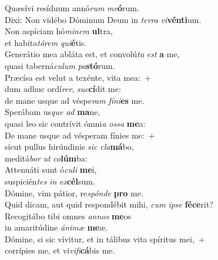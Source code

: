 \evenverse Quæsívi resíduum annó\textit{rum} \textit{me}\textbf{ó}rum.~\*\\
\evenverse Dixi: Non vidébo Dóminum Deum in \textit{ter}\textit{ra} \textit{vi}\textbf{vén}\textbf{ti}um.\\
\oddverse Non aspíciam hó\textit{mi}\textit{nem} \textbf{ul}tra,~\*\\
\oddverse et habita\textit{tó}\textit{rem} \textit{qui}\textbf{é}tis.\\
\evenverse Generátio mea abláta est, et convolú\textit{ta} \textit{est} \textbf{a} me,~\*\\
\evenverse quasi taberná\textit{cu}\textit{lum} \textit{pa}\textbf{stó}rum.\\
\oddverse Præcísa est velut a texénte, vita mea:~+\\
\oddverse  dum adhuc ordí\textit{rer}, \textit{suc}\textbf{cí}dit me:~\*\\
\oddverse de mane usque ad véspe\textit{ram} \textit{fí}\textit{ni}\textbf{es} me.\\
\evenverse Sperábam us\textit{que} \textit{ad} \textbf{ma}ne,~\*\\
\evenverse quasi leo sic contrívit ómni\textit{a} \textit{os}\textit{sa} \textbf{me}a:\\
\oddverse De mane usque ad vésperam fínies me:~+\\
\oddverse  sicut pullus hirúndinis \textit{sic} \textit{cla}\textbf{má}bo,~\*\\
\oddverse meditá\textit{bor} \textit{ut} \textit{co}\textbf{lúm}ba:\\
\evenverse Attenuáti sunt ó\textit{cu}\textit{li} \textbf{me}i,~\*\\
\evenverse suspicién\textit{tes} \textit{in} \textit{ex}\textbf{cél}sum.\\
\oddverse Dómine, vim pátior, re\textit{spón}\textit{de} \textbf{pro} me.~\*\\
\oddverse Quid dicam, aut quid respondébit mihi, \textit{cum} \textit{i}\textit{pse} \textbf{fé}\textbf{ce}rit?\\
\evenverse Recogitábo tibi omnes \textit{an}\textit{nos} \textbf{me}os~\*\\
\evenverse in amaritúdine \textit{á}\textit{ni}\textit{mæ} \textbf{me}æ.\\
\oddverse Dómine, si sic vívitur, et in tálibus vita spíritus mei,~+\\
\oddverse  corrípies me, et vi\textit{vi}\textit{fi}\textbf{cá}bis me.~\*\\
